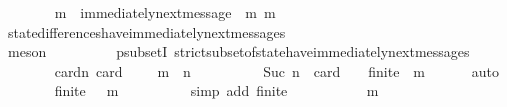 \begin{isabellebody}
\isanewline
\ \ \ \ \ \ \isamarkupfalse%
\ m\ \ {\isachardoublequoteopen}immediately{\isacharunderscore}next{\isacharunderscore}message\ {\isacharparenleft}{\isasymsigma}{\isacharcomma}\ m{\isacharparenright}{\isachardoublequoteclose}\ {\isachardoublequoteopen}m\ {\isasymin}\ {\isasymsigma}{\isacharprime}\ {\isacharminus}\ {\isasymsigma}{\isachardoublequoteclose}\ \isanewline
\ \ \ \ \ \ \ \ \isamarkupfalse%
\ state{\isacharunderscore}differences{\isacharunderscore}have{\isacharunderscore}immediately{\isacharunderscore}next{\isacharunderscore}messages\isanewline
\ \ \ \ \ \ \ \ \isamarkupfalse%
\ {\isacharparenleft}meson\ {\isacartoucheopen}{\isasymsigma}\ {\isasymnoteq}\ {\isasymsigma}{\isacharprime}{\isacartoucheclose}\ {\isacartoucheopen}{\isasymsigma}\ {\isasymsubseteq}\ {\isasymsigma}{\isacharprime}{\isacartoucheclose}\ {\isacartoucheopen}{\isasymsigma}{\isacharprime}\ {\isasymin}\ {\isasymSigma}{\isacartoucheclose}\ psubsetI\ strict{\isacharunderscore}subset{\isacharunderscore}of{\isacharunderscore}state{\isacharunderscore}have{\isacharunderscore}immediately{\isacharunderscore}next{\isacharunderscore}messages{\isacharparenright}\isanewline
\ \ \ \ \ \ \isamarkupfalse%
\ cardn{\isacharcolon}\ {\isachardoublequoteopen}card\ {\isacharparenleft}{\isasymsigma}{\isacharprime}\ {\isacharminus}\ {\isacharparenleft}{\isasymsigma}\ {\isasymunion}\ {\isacharbraceleft}m{\isacharbraceright}{\isacharparenright}{\isacharparenright}\ {\isacharequal}\ n{\isachardoublequoteclose}\isanewline
\ \ \ \ \ \ \ \ \isamarkupfalse%
\ {\isacartoucheopen}Suc\ n\ {\isacharequal}\ card\ {\isacharparenleft}{\isasymsigma}{\isacharprime}\ {\isacharminus}\ {\isasymsigma}{\isacharparenright}{\isacartoucheclose}\ {\isacartoucheopen}finite\ {\isasymsigma}{\isacharprime}{\isacartoucheclose}\ {\isacartoucheopen}m\ {\isasymin}\ {\isasymsigma}{\isacharprime}\ {\isacharminus}\ {\isasymsigma}{\isacartoucheclose}\ \isamarkupfalse%
\ auto\isanewline
\ \ \ \ \ \ \isamarkupfalse%
\ {\isachardoublequoteopen}finite\ {\isacharparenleft}{\isasymsigma}\ {\isasymunion}\ {\isacharbraceleft}m{\isacharbraceright}{\isacharparenright}{\isachardoublequoteclose}\isanewline
\ \ \ \ \ \ \ \ \isamarkupfalse%
\ {\isacharparenleft}simp\ add{\isacharcolon}\ {\isacartoucheopen}finite\ {\isasymsigma}{\isacartoucheclose}{\isacharparenright}\isanewline
\ \ \ \ \ \ \isamarkupfalse%
\ {\isachardoublequoteopen}{\isasymsigma}\ {\isasymunion}\ {\isacharbraceleft}m{\isacharbraceright}\ {\isasymin}\ {\isasymSigma}{\isachardoublequoteclose}\isanewline

\end{isabellebody}
